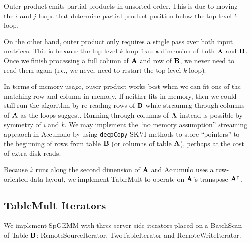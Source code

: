 Outer product emits partial products in unsorted order.
This is due to moving the $i$ and $j$ loops
that determine partial product position
below the top-level $k$ loop.

On the other hand, outer product only requires a single pass over both input matrices.
This is because the top-level $k$ loop fixes a dimension of both $\mathbf{A}$ and $\mathbf{B}$.
Once we finish processing a full column of $\mathbf{A}$ and row of $\mathbf{B}$,
we never need to read them again (i.e., we never need to restart the top-level $k$ loop).

In terms of memory usage, outer product works best when we can fit one of the matching row and column in memory.
If neither fits in memory, then we could still run the algorithm by
re-reading rows of $\mathbf{B}$ while streaming through columns of $\mathbf{A}$ as the loops suggest.
Running through columns of $\mathbf{A}$ instead is possible by symmetry of $i$ and $k$.
We may implement the ``no memory assumption'' streaming appraoch in Accumulo by using
\texttt{deepCopy} SKVI methods to store ``pointers'' to the beginning of rows from table $\mathbf{B}$
(or columns of table $\mathbf{A}$),
perhaps at the cost of extra disk reads.

Because $k$ runs along the second dimension of $\mathbf{A}$
and Accumulo uses a row-oriented data layout, we implement 
TableMult to operate on $\mathbf{A}$'s transpose $\mathbf{A^{\intercal}}$.



\subsection{TableMult Iterators}
\label{sTableMult}
We implement SpGEMM with three server-side iterators placed on a BatchScan of Table $\mathbf{B}$:
RemoteSourceIterator, TwoTableIterator and RemoteWriteIterator.

